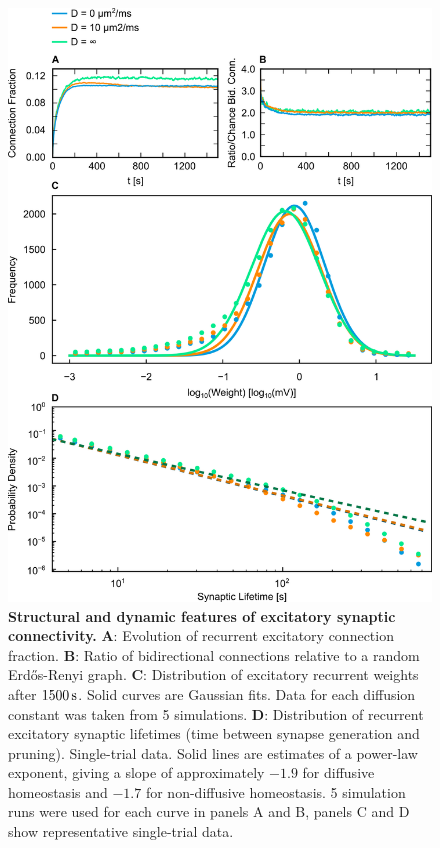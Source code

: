 \documentclass[10pt,letterpaper]{article}
\begin{document}
\begin{figure}
\begin{center}
\includegraphics[width=\textwidth]{./figures/syn_topology_comp.png}
\end{center}
\caption{{\bf Structural and dynamic features of excitatory synaptic connectivity.} \textbf{A}: Evolution of recurrent excitatory connection fraction. \textbf{B}: Ratio of bidirectional connections relative to a random Erd\H{o}s-Renyi graph. \textbf{C}: Distribution of excitatory recurrent weights after $\rm 1500\, s$. Solid curves are Gaussian fits. Data for each diffusion constant was taken from 5 simulations. \textbf{D}: Distribution of recurrent excitatory synaptic lifetimes (time between synapse generation and pruning). Single-trial data. Solid lines are estimates of a power-law exponent, giving a slope of approximately $\mathrm{-1.9}$ for diffusive homeostasis and $\mathrm{-1.7}$ for non-diffusive homeostasis. 5 simulation runs were used for each curve in panels A and B, panels C and D show representative single-trial data.}
\label{Syn_Topology_Features}
\end{figure}
\end{document}
